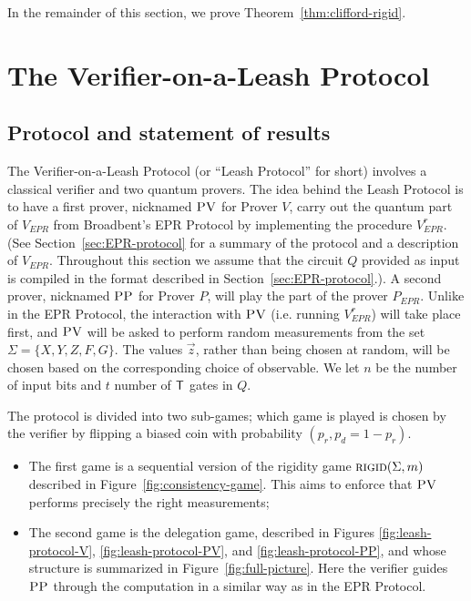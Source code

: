 \documentclass[11pt]{article}
\newcommand{\rigid}{\textsc{rigid}}
\newcommand{\pv}{\textsc{PV}}
\newcommand{\pp}{\textsc{PP}}
\begin{document}
In the remainder of this section, we prove Theorem~\ref{thm:clifford-rigid}.


\section{The Verifier-on-a-Leash Protocol}
\label{sec:leash}




\subsection{Protocol and statement of results}

The Verifier-on-a-Leash Protocol (or ``Leash Protocol'' for short) involves a classical verifier and two quantum provers.
The idea behind the Leash Protocol is to have a first prover, nicknamed $\pv$ for Prover $V$, carry out the quantum part of $V_{EPR}$ from Broadbent's EPR Protocol by implementing the procedure $V_{EPR}^r$. (See Section~\ref{sec:EPR-protocol} for a summary of the protocol and a description of $V_{EPR}$. Throughout this section we assume that the circuit $Q$ provided as input is compiled in the format described in Section~\ref{sec:EPR-protocol}.). A second prover, nicknamed $\pp$ for Prover $P$, will play the part of the prover $P_{EPR}$. Unlike in the EPR Protocol, the interaction with $\pv$ (i.e. running $V_{EPR}^r$) will take place {first}, and $\pv$ will be asked to perform {random} measurements from the set $\Sigma = \{X,Y,Z,F,G\}$. The values $\vec{z}$, rather than being chosen at random, will be chosen based on the corresponding choice of observable. We let $n$ be the number of input bits and $t$ number of $\sf T$ gates in $Q$. 

The protocol is divided into two sub-games; which game is played is chosen by the verifier by flipping a biased coin with probability $(p_r,p_d=1-p_r)$.
\begin{itemize}[nolistsep]
\item The first game is a sequential version of the rigidity game $\rigid(\Sigma,m)$ described in Figure~\ref{fig:consistency-game}. This aims to enforce that $\pv$ performs precisely the right measurements;

\item The second game is the delegation game, described in Figures \ref{fig:leash-protocol-V}, \ref{fig:leash-protocol-PV}, and \ref{fig:leash-protocol-PP}, and whose structure is summarized in Figure~\ref{fig:full-picture}. Here the verifier guides $\pp$ through the computation in a similar way as in the EPR Protocol.
\end{itemize}
\end{document}
